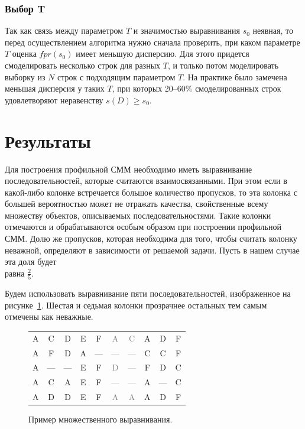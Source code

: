 \documentclass[specialist,
substylefile = spbu_report.rtx,
subf,href,colorlinks=true, 12pt]{disser}
\begin{document}
			\subsubsection{Выбор T}
			Так как связь между параметром $T$ и значимостью выравнивания $s_{0}$ неявная, то перед осуществлением алгоритма нужно сначала проверить, при каком параметре $T$ оценка $fpr(s_{0})$ имеет меньшую дисперсию. Для этого придется смоделировать несколько строк для разных $T$, и только потом моделировать выборку из $N$ строк с подходящим параметром $T$. На практике было замечена меньшая дисперсия у таких $T$, при которых 20--60$\%$ смоделированных строк удовлетворяют неравенству $s(D) \geq s_{0}$.
			
			\section{Результаты}						
			Для построения профильной СММ необходимо иметь выравнивание последовательностей, которые считаются взаимосвязанными. При этом если в какой-либо колонке встречается большое количество пропусков, то эта колонка с большей вероятностью может не отражать качества, свойственные всему множеству объектов, описываемых последовательностями. Такие колонки отмечаются и обрабатываются особым образом при построении профильной СММ. Долю же пропусков, которая необходима для того, чтобы считать колонку неважной, определяют в зависимости от решаемой задачи. Пусть в нашем случае эта доля будет \\равна $\frac{2}{5}$.
			
			Будем использовать выравнивание пяти последовательностей, изображенное на рисунке~\ref{fg:4}. Шестая и седьмая колонки прозрачнее остальных тем самым отмечены как неважные.		
			\begin{figure}[h]
				\centering
				\begin{tabular}{cccccccccc}
					A&C&D&E&F&\textcolor{gray}{A}&\textcolor{gray}{C}&A&D&F\\
					A&F&D&A&—&\textcolor{gray}{—}&\textcolor{gray}{—}&C&C&F\\
					A&—&—&E&F&\textcolor{gray}{D}&\textcolor{gray}{—}&F&D&C\\
					A&C&A&E&F&\textcolor{gray}{—}&\textcolor{gray}{—}&A&—&C\\
					A&D&D&E&F&\textcolor{gray}{A}&\textcolor{gray}{A}&A&D&F
				\end{tabular}
				\caption{Пример множественного выравнивания.} \label{fg:4}
			\end{figure}					
			
\end{document}
